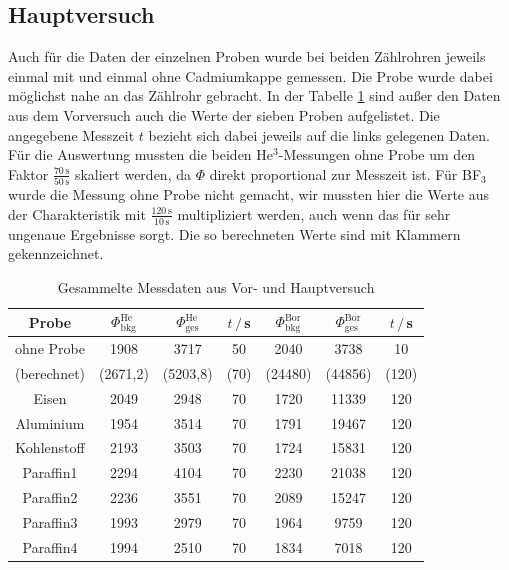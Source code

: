 \documentclass[german, parskip=full]{scrartcl}
\newcommand{\tecxt}{}
\begin{document}
\subsection{Hauptversuch}
Auch für die Daten der einzelnen Proben wurde bei beiden Zählrohren jeweils einmal mit und einmal ohne Cadmiumkappe gemessen. Die Probe wurde dabei möglichst nahe an das Zählrohr gebracht. In der Tabelle \ref{table:Messdaten} sind außer den Daten aus dem Vorversuch auch die Werte der sieben Proben aufgelistet. Die angegebene Messzeit $t$ bezieht sich dabei jeweils auf die links gelegenen Daten. Für die Auswertung mussten die beiden He${}^3$-Messungen ohne Probe um den Faktor $\frac{70\,\tecxt\text{s}}{50\,\tecxt\text{s}}$ skaliert werden, da $\Phi$ direkt proportional zur Messzeit ist. Für BF${}_3$ wurde die Messung ohne Probe nicht gemacht, wir mussten hier die Werte aus der Charakteristik mit $\frac{120\,\tecxt\text{s}}{10\,\tecxt\text{s}}$ multipliziert werden, auch wenn das für sehr ungenaue Ergebnisse sorgt. Die so berechneten Werte sind mit Klammern gekennzeichnet.
\begin{table}[h!]
\centering
\begin{tabular}{c||c|c|c||c|c|c}
Probe&$\Phi_\tecxt\text{bkg}^\tecxt\text{He}$&$\Phi_\tecxt\text{ges}^\tecxt\text{He}$&$t\,/\,$s&$\Phi_\tecxt\text{bkg}^\tecxt\text{Bor}$&$\Phi_\tecxt\text{ges}^\tecxt\text{Bor}$&$t\,/\,$s\\ \hline
ohne Probe&1908&3717&50&2040&3738&10\\
(berechnet)&(2671,2)& (5203,8)&(70)&(24480)&(44856)&(120)\\ \hline
Eisen&2049&2948&70&1720&11339&120\\ \hline
Aluminium&1954&3514&70&1791&19467&120\\ \hline
Kohlenstoff&2193&3503&70&1724&15831&120\\ \hline
Paraffin1&2294&4104&70&2230&21038&120\\ \hline
Paraffin2&2236&3551&70&2089&15247&120\\ \hline
Paraffin3&1993&2979&70&1964&9759&120\\ \hline
Paraffin4&1994&2510&70&1834&7018&120\\
\end{tabular}
\caption{Gesammelte Messdaten aus Vor- und Hauptversuch}
\label{table:Messdaten}
\end{table}
\end{document}
